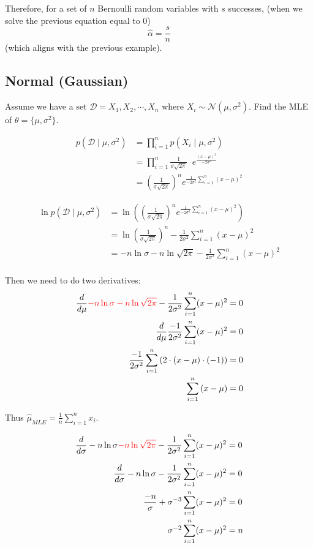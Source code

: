 Therefore, for a set of $n$ Bernoulli random variables with $s$ successes, (when we solve the previous equation equal to 0) 
\[\hat\alpha = \frac{s}{n}\]
(which aligns with the previous example). 

\subsection{Normal (Gaussian)}
Assume we have a set $\mathcal{D} = X_1, X_2, \cdots, X_n$ 
where $X_i \sim \mathcal{N}(\mu, \sigma^2)$.
Find the MLE of $\theta = \{\mu,\sigma^2\}$.

\begin{align*}
p(\mathcal{D}\mid\mu,\sigma^2) & = \prod_{i=1}^n p(X_i\mid\mu,\sigma^2)\\
						& = \prod_{i=1}^n \frac{1}{\sigma\sqrt{2\pi}}\;\;e^{\frac{(x-\mu)^2}{-2\sigma^2}}\\
						& = \left( \frac{1}{\sigma\sqrt{2\pi}}\right)^n e^{\frac{1}{-2\sigma^2}\sum_{i=1}^n (x-\mu)^2}		     
\end{align*}

\begin{align*}
\ln p(\mathcal{D}\mid\mu,\sigma^2) 
						& = \ln \left(\left( \frac{1}{\sigma\sqrt{2\pi}}\right)^n e^{\frac{1}{-2\sigma^2}\sum_{i=1}^n (x-\mu)^2}\right)	\\
						& = \ln \left( \frac{1}{\sigma\sqrt{2\pi}}\right)^n - \frac{1}{2\sigma^2}\sum_{i=1}^n (x-\mu)^2	\\	
						& = -n \ln \sigma - n \ln \sqrt{2\pi} - \frac{1}{2\sigma^2}\sum_{i=1}^n (x-\mu)^2	\\	     
\end{align*}

Then we need to do two derivatives: 
\begin{align*}
\frac{d}{d\mu} {\color{red}-n \ln \sigma - n \ln \sqrt{2\pi} }- \frac{1}{2\sigma^2}\sum_{i=1}^n (x-\mu)^2 &= 0\\
\frac{d}{d\mu} \frac{-1}{2\sigma^2}\sum_{i=1}^n (x-\mu)^2 &= 0\\
\frac{-1}{2\sigma^2}\sum_{i=1}^n \left(2\cdot(x-\mu)\cdot(-1)\right) &= 0\\
\sum_{i=1}^n \left(x-\mu\right) &= 0\\
\end{align*}

Thus $\displaystyle\hat\mu_{MLE} = \frac{1}{n}\sum_{i=1}^n x_i$. 

\begin{align*}
\frac{d}{d\sigma} -n \ln \sigma {\color{red}- n \ln \sqrt{2\pi} }- \frac{1}{2\sigma^2}\sum_{i=1}^n (x-\mu)^2 &= 0\\
\frac{d}{d\sigma} -n \ln \sigma - \frac{1}{2\sigma^2}\sum_{i=1}^n (x-\mu)^2&= 0\\
\frac{-n}{\sigma} + \sigma^{-3}\sum_{i=1}^n (x-\mu)^2 &= 0\\
\sigma^{-2}\sum_{i=1}^n (x-\mu)^2 &= n\\
\end{align*}

